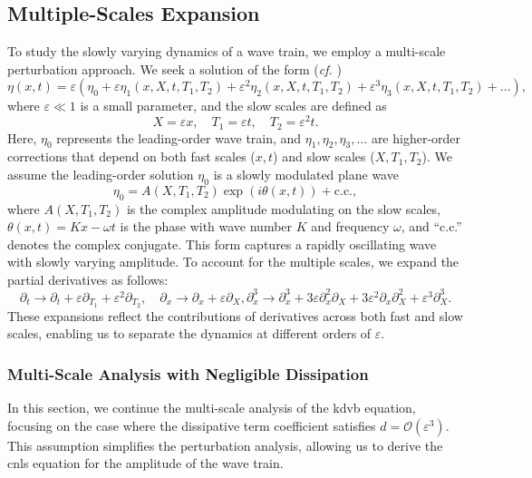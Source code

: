 \documentclass[alpha-refs, 12pt]{wiley-article}
\renewcommand{\O}{\mathcal{O}}
\newcommand{\eps}{\varepsilon}
\begin{document}
\subsection*{Multiple-Scales Expansion}

To study the slowly varying dynamics of a wave train, we employ a multi-scale perturbation approach. We seek a solution of the form (\emph{cf.} \citet{Dias2005})
\begin{equation}
  \label{eq:ansatz}
  \eta(x,t) = \eps \left( \eta_0 + \eps \eta_1(x, X, t, T_1, T_2) + \eps^2 \eta_2(x, X, t, T_1, T_2) + \eps^3 \eta_3(x, X, t, T_1, T_2) + \dots \right),
\end{equation}
where $\eps \ll 1$ is a small parameter, and the slow scales are defined as
\[
  X = \eps x, \quad T_1 = \eps t, \quad T_2 = \eps^2 t.
\]
Here, $\eta_0$ represents the leading-order wave train, and $\eta_1, \eta_2, \eta_3, \dots$ are higher-order corrections that depend on both fast scales ($x, t$) and slow scales ($X, T_1, T_2$). We assume the leading-order solution $\eta_0$ is a slowly modulated plane wave
\begin{equation}\label{eq:wave_train}
  \eta_0 = A(X, T_1, T_2) \exp(i \theta(x, t)) + \text{c.c.},
\end{equation}
where $A(X, T_1, T_2)$ is the complex amplitude modulating on the slow scales, $\theta(x, t) = K x - \omega t$ is the phase with wave number $K$ and frequency $\omega$, and ``c.c.'' denotes the complex conjugate. This form captures a rapidly oscillating wave with slowly varying amplitude. To account for the multiple scales, we expand the partial derivatives as follows:
\begin{equation*}\label{eq:derivative_expansion}
  \partial_t \rightarrow \partial_t + \eps \partial_{T_1} + \eps^2 \partial_{T_2}, \quad \partial_x \rightarrow \partial_x + \eps \partial_X, \partial_x^3 \rightarrow \partial_x^3 + 3 \eps \partial_x^2 \partial_X + 3 \eps^2 \partial_x \partial_X^2 + \eps^3 \partial_X^3.
\end{equation*}
These expansions reflect the contributions of derivatives across both fast and slow scales, enabling us to separate the dynamics at different orders of $\eps$.

\subsubsection{Multi-Scale Analysis with Negligible Dissipation}

In this section, we continue the multi-scale analysis of the \acrshort{kdvb} equation, focusing on the case where the dissipative term coefficient satisfies $d = \O(\eps^3)$. This assumption simplifies the perturbation analysis, allowing us to derive the \acrfull{cnls} equation for the amplitude of the wave train.
\end{document}
